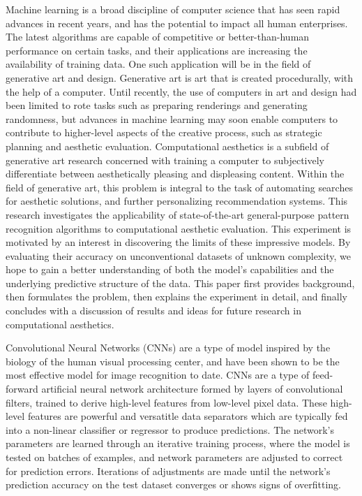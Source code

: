 \documentclass[midd]{thesis}
\begin{document}
Machine learning is a broad discipline of computer science that has seen rapid advances in recent years, and has the potential to impact all human enterprises. The latest algorithms are capable of competitive or better-than-human performance on certain tasks, and their applications are increasing the availability of training data. One such application will be in the field of generative art and design. Generative art is art that is created procedurally, with the help of a computer. Until recently, the use of computers in art and design had been limited to rote tasks such as preparing renderings and generating randomness, but advances in machine learning may soon enable computers to contribute to higher-level aspects of the creative process, such as strategic planning and aesthetic evaluation. Computational aesthetics is a subfield of generative art research concerned with training a computer to subjectively differentiate between aesthetically pleasing and displeasing content. Within the field of generative art, this problem is integral to the task of automating searches for aesthetic solutions, and further personalizing recommendation systems. This research investigates the applicability of state-of-the-art general-purpose pattern recognition algorithms to computational aesthetic evaluation. This experiment is motivated by an interest in discovering the limits of these impressive models. By evaluating their accuracy on unconventional datasets of unknown complexity, we hope to gain a better understanding of both the model's capabilities and the underlying predictive structure of the data. This paper first provides background, then formulates the problem, then explains the experiment in detail, and finally concludes with a discussion of results and ideas for future research in computational aesthetics.

Convolutional Neural Networks (CNNs) are a type of model inspired by the biology of the human visual processing center, and have been shown to be the most effective model for image recognition to date.
CNNs are a type of feed-forward artificial neural network architecture formed by layers of convolutional filters, trained to derive high-level features from low-level pixel data. These high-level features are powerful and versatitle data separators which are typically fed into a non-linear classifier or regressor to produce predictions. The network's parameters are learned through an iterative training process, where the model is tested on batches of examples, and network parameters are adjusted to correct for prediction errors. Iterations of adjustments are made until the network's prediction accuracy on the test dataset converges or shows signs of overfitting.
\end{document}

